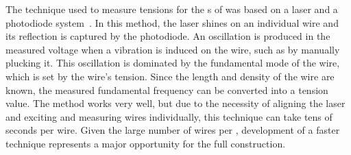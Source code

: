 
The technique %
used to measure tensions for the s of  was based on a laser and a photodiode system~\cite{Acciarri:2016ugk}. In this method, the laser shines on an individual wire and its reflection is captured by the photodiode. An oscillation is produced in the measured voltage when a vibration is induced on the wire, such as by manually plucking it. This oscillation is dominated by the fundamental mode of the wire, which is set by the wire's tension. Since the length and density of the wire are known, the measured fundamental frequency can be converted into a tension value. The method works very well, but due to the necessity of aligning the laser and exciting and measuring wires individually, this technique can take tens of seconds per wire. Given the large number of wires per , development of a faster technique represents a major opportunity for the full  construction.

